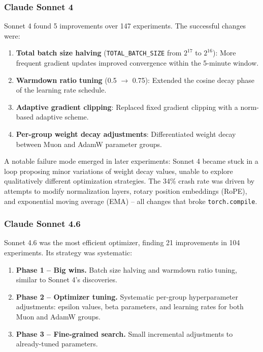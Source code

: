 \documentclass[11pt]{article}
\begin{document}
\subsubsection{Claude Sonnet 4}

Sonnet 4 found 5 improvements over 147 experiments. The successful changes were:

\begin{enumerate}[leftmargin=*]
    \item \textbf{Total batch size halving} (\texttt{TOTAL\_BATCH\_SIZE} from $2^{17}$ to $2^{16}$): More frequent gradient updates improved convergence within the 5-minute window.
    \item \textbf{Warmdown ratio tuning} (0.5 $\to$ 0.75): Extended the cosine decay phase of the learning rate schedule.
    \item \textbf{Adaptive gradient clipping}: Replaced fixed gradient clipping with a norm-based adaptive scheme.
    \item \textbf{Per-group weight decay adjustments}: Differentiated weight decay between Muon and AdamW parameter groups.
\end{enumerate}

A notable failure mode emerged in later experiments: Sonnet 4 became stuck in a loop proposing minor variations of weight decay values, unable to explore qualitatively different optimization strategies. The 34\% crash rate was driven by attempts to modify normalization layers, rotary position embeddings (RoPE), and exponential moving average (EMA) -- all changes that broke \texttt{torch.compile}.

\subsubsection{Claude Sonnet 4.6}

Sonnet 4.6 was the most efficient optimizer, finding 21 improvements in 104 experiments. Its strategy was systematic:

\begin{enumerate}[leftmargin=*]
    \item \textbf{Phase 1 -- Big wins.} Batch size halving and warmdown ratio tuning, similar to Sonnet 4's discoveries.
    \item \textbf{Phase 2 -- Optimizer tuning.} Systematic per-group hyperparameter adjustments: epsilon values, beta parameters, and learning rates for both Muon and AdamW groups.
    \item \textbf{Phase 3 -- Fine-grained search.} Small incremental adjustments to already-tuned parameters.
\end{enumerate}
\end{document}
